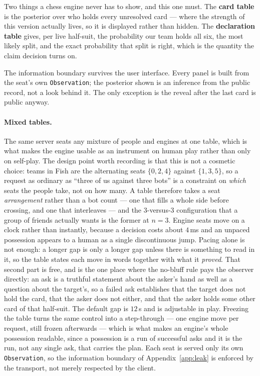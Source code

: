 \documentclass[11pt,a4paper]{article}
\begin{document}
Two things a chess engine never has to show, and this one must. The
\textbf{card table} is the posterior over who holds every unresolved card ---
where the strength of this version actually lives, so it is displayed rather
than hidden. The \textbf{declaration table} gives, per live half-suit, the
probability our team holds all six, the most likely split, and the exact
probability that split is right, which is the quantity the claim decision turns
on.

The information boundary survives the user interface. Every panel is built from
the seat's own \texttt{Observation}; the posterior shown is an inference from the
public record, not a look behind it. The only exception is the reveal after the
last card is public anyway.

\paragraph{Mixed tables.} The same server seats any mixture of people and
engines at one table, which is what makes the engine usable as an instrument on
human play rather than only on self-play. The design point worth recording is
that this is not a cosmetic choice: teams in Fish are the alternating seats
$\{0,2,4\}$ against $\{1,3,5\}$, so a request as ordinary as ``three of us
against three bots'' is a constraint on \emph{which} seats the people take, not
on how many. A table therefore takes a seat \emph{arrangement} rather than a bot
count --- one that fills a whole side before crossing, and one that interleaves
--- and the 3-versus-3 configuration that a group of friends actually wants is
the former at $n=3$. Engine seats move on a clock rather than instantly, because
a decision costs about $4$\,ms and an unpaced possession appears to a human as a
single discontinuous jump. Pacing alone is not enough: a longer gap is
only a longer gap unless there is something to read in it, so the table
states each move in words together with what it \emph{proved}. That
second part is free, and is the one place where the no-bluff rule pays
the observer directly: an ask is a truthful statement about the asker's
hand as well as a question about the target's, so a failed ask
establishes that the target does not hold the card, that the asker does
not either, and that the asker holds some other card of that half-suit.
The default gap is $12$\,s and is adjustable in play. Freezing the table
turns the same control into a step-through --- one engine move per
request, still frozen afterwards --- which is what makes an engine's
whole possession readable, since a possession is a run of successful
asks and it is the run, not any single ask, that carries the plan. Each seat is served only its own
\texttt{Observation}, so the information boundary of
Appendix~\ref{app:leak} is enforced by the transport, not merely respected by
the client.
\end{document}
